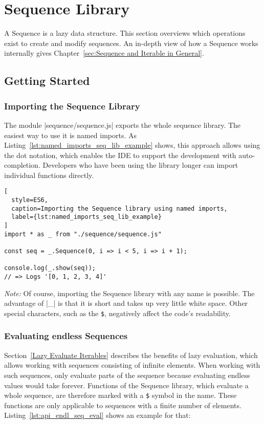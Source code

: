 \section{Sequence Library} %
A Sequence is a lazy data structure. This section overviews which operations
exist to create and modify sequences. An in-depth view of how a Sequence works
internally gives Chapter~\ref{sec:Sequence and Iterable in General}.

\subsection{Getting Started} %
\label{sub:Getting Started}
\subsubsection{Importing the Sequence Library} %
\label{sec:Importing the Sequence Library}

The module |sequence/sequence.js| exports the whole sequence library. The
easiest way to use it is named imports. As
Listing~\ref{lst:named_imports_seq_lib_example} shows, this approach allows
using the dot notation, which enables the IDE to support the development with
auto-completion. Developers who have been using the library longer can import
individual functions directly.
\begin{lstlisting}[
  style=ES6,
  caption=Importing the Sequence library using named imports,
  label={lst:named_imports_seq_lib_example}
]
import * as _ from "./sequence/sequence.js"

const seq = _.Sequence(0, i => i < 5, i => i + 1);

console.log(_.show(seq));
// => Logs '[0, 1, 2, 3, 4]'
\end{lstlisting}
\textit{Note:} Of course, importing the Sequence library with any name is
possible. The advantage of |_| is that it is short and takes up very little
white space. Other special characters, such as the \lstinline{$}, negatively
affect the code's readability. 

\subsubsection{Evaluating endless Sequences} %
\label{sec:Evaluating endless Sequences}
Section~\ref{Lazy Evaluate Iterables} describes the benefits of lazy
evaluation, which allows working with sequences consisting of infinite
elements. When working with such sequences, only evaluate parts of the sequence
because evaluating endless values would take forever. Functions of the Sequence
library, which evaluate a whole sequence, are therefore marked with a
\lstinline{$} symbol in the name. These functions are only applicable to
sequences with a finite number of elements. \\
Listing~\ref{lst:api_endl_seq_eval} shows an example for that:

